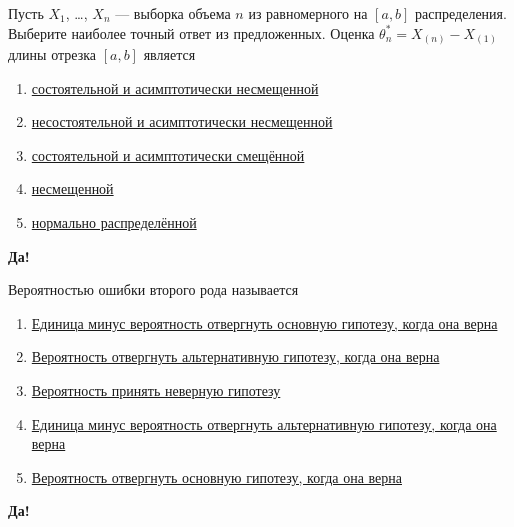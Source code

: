 \documentclass[t]{beamer}
\begin{document}
 \begin{frame} \label{7-Yes} 
\begin{block}{7} 

Пусть $X_1$, \ldots, $X_n$ — выборка объема $n$ из равномерного на $[a, b]$ распределения. Выберите наиболее точный ответ из предложенных. Оценка $\theta^*_n = X_{(n)}-X_{(1)}$ длины отрезка $[a,b]$ является
 


 \end{block} 
\begin{enumerate} 
\item[] \hyperlink{7-Yes}{\beamergotobutton{} состоятельной и асимптотически несмещенной}
\item[] \hyperlink{7-No}{\beamergotobutton{} несостоятельной и асимптотически несмещенной}
\item[] \hyperlink{7-No}{\beamergotobutton{} состоятельной и асимптотически смещённой}
\item[] \hyperlink{7-No}{\beamergotobutton{} несмещенной}
\item[] \hyperlink{7-No}{\beamergotobutton{} нормально распределённой}
\end{enumerate} 

 \textbf{Да!} 
 \hyperlink{8}{}\end{frame} 


 \begin{frame} \label{8-Yes} 
\begin{block}{8} 

Вероятностью ошибки второго рода называется
 


 \end{block} 
\begin{enumerate} 
\item[] \hyperlink{8-No}{\beamergotobutton{} Единица минус  вероятность отвергнуть основную гипотезу, когда она верна}
\item[] \hyperlink{8-Yes}{\beamergotobutton{} Вероятность отвергнуть альтернативную гипотезу, когда она верна}
\item[] \hyperlink{8-No}{\beamergotobutton{} Вероятность принять неверную гипотезу}
\item[] \hyperlink{8-No}{\beamergotobutton{} Единица минус  вероятность отвергнуть альтернативную гипотезу, когда она верна}
\item[] \hyperlink{8-No}{\beamergotobutton{} Вероятность отвергнуть основную гипотезу, когда она верна}
\end{enumerate} 

 \textbf{Да!} 
 \hyperlink{9}{}\end{frame} 
\end{document}
